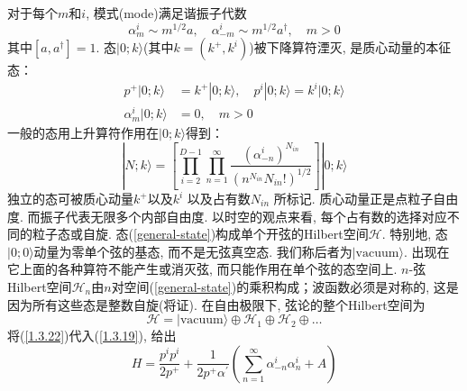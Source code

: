 \noindent 对于每个$m$和$i$, 模式(mode)满足谐振子代数
\begin{equation}
\alpha_{m}^{i} \sim m^{1 / 2} a, \quad \alpha_{-m}^{i} \sim m^{1 / 2} a^{\dagger}, \quad m>0
\end{equation}
其中$[a,a^\dagger]=1$.
态$|0;k \rangle$(其中$k=(k^+,k^i)$)被下降算符湮灭, 是质心动量的本征态：
\begin{subequations}
\begin{align}
p^{+}|0 ; k\rangle&=k^{+}|0 ; k\rangle, \quad p^{i}|0 ; k\rangle=k^{i}|0 ; k\rangle \\
\alpha_{m}^{i}|0 ; k\rangle&=0, \quad m>0
\end{align}
\end{subequations}
一般的态用上升算符作用在$|0;k \rangle$得到：
\begin{equation}
|N ; k\rangle=\left[\prod_{i=2}^{D-1} \prod_{n=1}^{\infty} \frac{\left(\alpha_{-n}^{i}\right)^{N_{i n}}}{\left(n^{N_{i n}} N_{i n} !\right)^{1 / 2}}\right]|0 ; k\rangle\label{general-state}
\end{equation}
独立的态可被质心动量$k^+$以及$k^i$ 以及占有数$N_{in}$ 所标记. 质心动量正是点粒子自由度. 而振子代表无限多个内部自由度. 以时空的观点来看, 每个占有数的选择对应不同的粒子态或自旋. 态(\ref{general-state})构成单个开弦的Hilbert空间$\mathscr{H}$. 特别地, 态$|0;0 \rangle$动量为零单个弦的基态, 而不是无弦真空态. 我们称后者为$|\text{vacuum} \rangle$. 出现在它上面的各种算符不能产生或消灭弦, 而只能作用在单个弦的态空间上. $n$-弦Hilbert空间$\mathscr{H}_n$由$n$对空间(\ref{general-state})的乘积构成；波函数必须是对称的, 这是因为所有这些态是整数自旋(将证). 在自由极限下, 弦论的整个Hilbert空间为
\begin{equation}
\mathscr{H}=\lvert \text{vacuum}\rangle \oplus \mathscr{H}_{1} \oplus \mathscr{H}_{2} \oplus \ldots
\end{equation}
将(\ref{1.3.22})代入(\ref{1.3.19}), 给出
\begin{equation}
H=\frac{p^{i} p^{i}}{2 p^{+}}+\frac{1}{2 p^{+} \alpha^{\prime}}\left(\sum_{n=1}^{\infty} \alpha_{-n}^{i} \alpha_{n}^{i}+A\right)
\end{equation}
